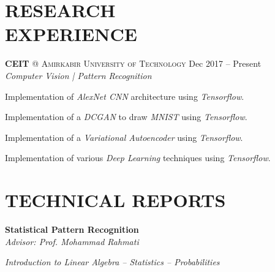 \documentclass[margin, 10pt]{res} %
\begin{document}
\begin{resume}
    \section{RESEARCH \\ EXPERIENCE} 

	\textbf{CEIT} \textsc{@} \textsc{Amirkabir University of Technology}
	\hfill {Dec 2017 -- Present}\\
	\textit{Computer Vision | Pattern Recognition}
	\vspace{0.15cm}
	\begin{innerlist}
		
		\item Implementation of \textit{AlexNet CNN} architecture using \textit{Tensorflow}.
		\href{https://github.com/aligholamee/AlexNet-Tensorflow}{\hfill{\UrlFont[code]}}
		
		\item Implementation of a \textit{DCGAN} to draw \textit{MNIST} using \textit{Tensorflow}.
		\href{https://github.com/aligholamee/MNIST-Drawer-DCGAN}{\hfill{\UrlFont[code]}}
		
		\item Implementation of a \textit{Variational Autoencoder} 	using \textit{Tensorflow}.
		\href{https://github.com/aligholamee/MNIST-Drawer-VAE}{\hfill{\UrlFont[code]}}
		
		\item Implementation of various \textit{Deep Learning} techniques using \textit{Tensorflow}.
		\href{https://github.com/aligholamee/notMNIST}{\hfill{\UrlFont[code]}}
		
	\end{innerlist}

     
    \section{TECHNICAL REPORTS}
        \textbf{Statistical Pattern Recognition}\\
		\textit{Advisor: Prof. Mohammad Rahmati}
		\begin{innerlist}
			\item \textit{Introduction to Linear Algebra -- Statistics -- Probabilities} \href{https://github.com/aligholamee/Patterns/raw/master/docs/assignment-1/SPR_9531504_HW1.pdf}{\hfill\UrlFont[docs]}
			

\end{innerlist}
\end{resume}
\end{document}
